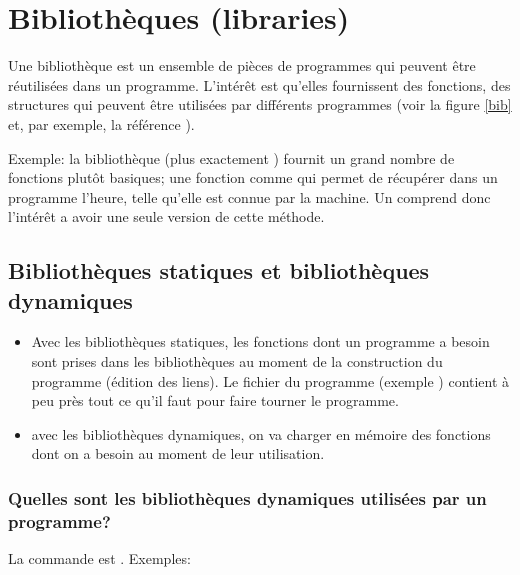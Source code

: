 \section{Bibliothèques (libraries)}

Une bibliothèque est un ensemble  de pièces de programmes qui peuvent
être réutilisées dans un programme. L'intérêt est qu'elles fournissent
des fonctions, des structures qui peuvent être utilisées par
différents programmes (voir la figure \ref{bib} et, par exemple, la
référence  \cite{wplib}).

Exemple: la bibliothèque  (plus exactement )
fournit un grand nombre de fonctions plutôt basiques; une fonction
comme  qui permet de récupérer dans un programme l'heure,
telle qu'elle est connue par la machine. Un comprend donc l'intérêt a
avoir une seule version de cette méthode.

\subsection{Bibliothèques statiques et bibliothèques dynamiques}
\begin{itemize}
  \item Avec les bibliothèques statiques, les fonctions dont un
    programme a besoin sont prises dans les bibliothèques au moment de
    la construction du programme (édition des liens). Le fichier du
    programme (exemple  ) contient à peu près
    tout ce qu'il faut pour faire tourner le programme.

  \item avec les bibliothèques dynamiques, on va charger en mémoire
    des fonctions dont on a besoin au moment de leur utilisation.
\end{itemize}

\subsubsection*{Quelles sont les bibliothèques dynamiques utilisées
  par un programme?}

La commande est . Exemples:

